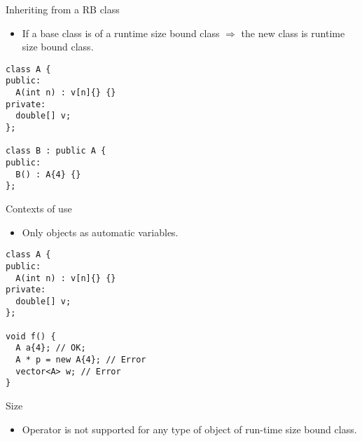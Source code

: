 \begin{frame}[t,fragile]{Inheriting from a RB class}
  \begin{itemize}
    \item If a base class is of a runtime size bound class $\Rightarrow$ the new class is runtime size bound class.
  \end{itemize}
\begin{lstlisting}[style=cpp11]
class A {
public:
  A(int n) : v[n]{} {}
private:
  double[] v;
};

class B : public A {
public:
  B() : A{4} {}
};
\end{lstlisting}
\end{frame}

\begin{frame}[t,fragile]{Contexts of use}
\begin{itemize}
  \item Only objects as automatic variables.
\end{itemize}
\begin{lstlisting}[style=cpp11]
class A {
public:
  A(int n) : v[n]{} {}
private:
  double[] v;
};

void f() {
  A a{4}; // OK;
  A * p = new A{4}; // Error
  vector<A> w; // Error
}
\end{lstlisting}
\end{frame}

\begin{frame}[t]{Size}
  \begin{itemize}
    \item Operator  is not supported for any type of object of run-time size bound class.
  \end{itemize}
\end{frame}

